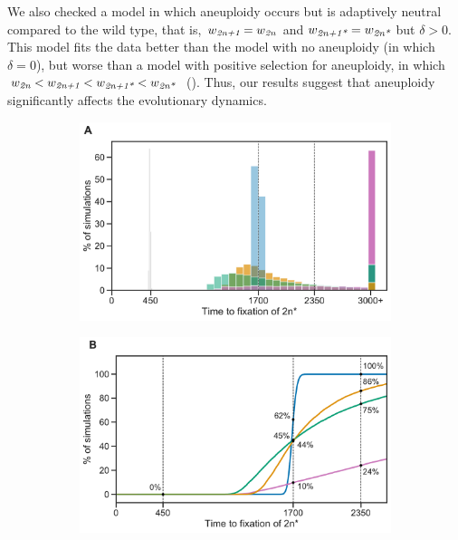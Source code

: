 \documentclass[12pt]{extarticle}
\newcommand{\euwt}{\emph{2n}}
\newcommand{\anwt}{\emph{2n+1}}
\newcommand{\eumt}{\emph{2n*}}
\newcommand{\anmt}{\emph{2n+1*}}
\begin{document}
We also checked a model in which aneuploidy occurs but is adaptively neutral compared to the wild type, that is, $w_{\anwt} = w_{\euwt}$ and $w_{\anmt} = w_{\eumt}$ but $\delta>0$. This model fits the data better than the model with no aneuploidy (in which $\delta=0$), but worse than a model with positive selection for aneuploidy, in which $w_{\euwt}<w_{\anwt}<w_{\anmt}<w_{\eumt}$~(). 
Thus, our results suggest that aneuploidy significantly affects the evolutionary dynamics.

\begin{figure}[h!]
  \begin{subfigure}{0.5\textwidth}
      \centering
      \includegraphics[width=\textwidth]{../figures/fixation-plot-a.pdf}      
      \label{fig:fit}
  \end{subfigure}
  \begin{subfigure}{0.5\textwidth}
      \centering
      \includegraphics[width=\textwidth]{../figures/fixation-plot-b.pdf}      

\end{subfigure}
\end{figure}
\end{document}
